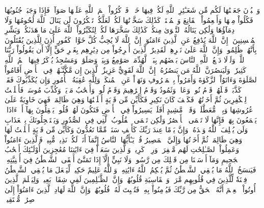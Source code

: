 وَٱلۡبُدۡنَ جَعَلۡنَٰهَا لَكُم مِّن شَعَـٰٓئِرِ ٱللَّهِ لَكُمۡ فِيهَا خَيۡرٞۖ فَٱذۡكُرُواْ ٱسۡمَ ٱللَّهِ عَلَيۡهَا صَوَآفَّۖ فَإِذَا وَجَبَتۡ جُنُوبُهَا فَكُلُواْ مِنۡهَا وَأَطۡعِمُواْ ٱلۡقَانِعَ وَٱلۡمُعۡتَرَّۚ كَذَٰلِكَ سَخَّرۡنَٰهَا لَكُمۡ لَعَلَّكُمۡ تَشۡكُرُونَ
لَن يَنَالَ ٱللَّهَ لُحُومُهَا وَلَا دِمَآؤُهَا وَلَٰكِن يَنَالُهُ ٱلتَّقۡوَىٰ مِنكُمۡۚ كَذَٰلِكَ سَخَّرَهَا لَكُمۡ لِتُكَبِّرُواْ ٱللَّهَ عَلَىٰ مَا هَدَىٰكُمۡۗ وَبَشِّرِ ٱلۡمُحۡسِنِينَ
۞إِنَّ ٱللَّهَ يُدَٰفِعُ عَنِ ٱلَّذِينَ ءَامَنُوٓاْۗ إِنَّ ٱللَّهَ لَا يُحِبُّ كُلَّ خَوَّانٖ كَفُورٍ
أُذِنَ لِلَّذِينَ يُقَٰتَلُونَ بِأَنَّهُمۡ ظُلِمُواْۚ وَإِنَّ ٱللَّهَ عَلَىٰ نَصۡرِهِمۡ لَقَدِيرٌ
ٱلَّذِينَ أُخۡرِجُواْ مِن دِيَٰرِهِم بِغَيۡرِ حَقٍّ إِلَّآ أَن يَقُولُواْ رَبُّنَا ٱللَّهُۗ وَلَوۡلَا دَفۡعُ ٱللَّهِ ٱلنَّاسَ بَعۡضَهُم بِبَعۡضٖ لَّهُدِّمَتۡ صَوَٰمِعُ وَبِيَعٞ وَصَلَوَٰتٞ وَمَسَٰجِدُ يُذۡكَرُ فِيهَا ٱسۡمُ ٱللَّهِ كَثِيرٗاۗ وَلَيَنصُرَنَّ ٱللَّهُ مَن يَنصُرُهُۥٓۚ إِنَّ ٱللَّهَ لَقَوِيٌّ عَزِيزٌ
ٱلَّذِينَ إِن مَّكَّنَّـٰهُمۡ فِي ٱلۡأَرۡضِ أَقَامُواْ ٱلصَّلَوٰةَ وَءَاتَوُاْ ٱلزَّكَوٰةَ وَأَمَرُواْ بِٱلۡمَعۡرُوفِ وَنَهَوۡاْ عَنِ ٱلۡمُنكَرِۗ وَلِلَّهِ عَٰقِبَةُ ٱلۡأُمُورِ
وَإِن يُكَذِّبُوكَ فَقَدۡ كَذَّبَتۡ قَبۡلَهُمۡ قَوۡمُ نُوحٖ وَعَادٞ وَثَمُودُ
وَقَوۡمُ إِبۡرَٰهِيمَ وَقَوۡمُ لُوطٖ
وَأَصۡحَٰبُ مَدۡيَنَۖ وَكُذِّبَ مُوسَىٰۖ فَأَمۡلَيۡتُ لِلۡكَٰفِرِينَ ثُمَّ أَخَذۡتُهُمۡۖ فَكَيۡفَ كَانَ نَكِيرِ
فَكَأَيِّن مِّن قَرۡيَةٍ أَهۡلَكۡنَٰهَا وَهِيَ ظَالِمَةٞ فَهِيَ خَاوِيَةٌ عَلَىٰ عُرُوشِهَا وَبِئۡرٖ مُّعَطَّلَةٖ وَقَصۡرٖ مَّشِيدٍ
أَفَلَمۡ يَسِيرُواْ فِي ٱلۡأَرۡضِ فَتَكُونَ لَهُمۡ قُلُوبٞ يَعۡقِلُونَ بِهَآ أَوۡ ءَاذَانٞ يَسۡمَعُونَ بِهَاۖ فَإِنَّهَا لَا تَعۡمَى ٱلۡأَبۡصَٰرُ وَلَٰكِن تَعۡمَى ٱلۡقُلُوبُ ٱلَّتِي فِي ٱلصُّدُورِ
وَيَسۡتَعۡجِلُونَكَ بِٱلۡعَذَابِ وَلَن يُخۡلِفَ ٱللَّهُ وَعۡدَهُۥۚ وَإِنَّ يَوۡمًا عِندَ رَبِّكَ كَأَلۡفِ سَنَةٖ مِّمَّا تَعُدُّونَ
وَكَأَيِّن مِّن قَرۡيَةٍ أَمۡلَيۡتُ لَهَا وَهِيَ ظَالِمَةٞ ثُمَّ أَخَذۡتُهَا وَإِلَيَّ ٱلۡمَصِيرُ
قُلۡ يَـٰٓأَيُّهَا ٱلنَّاسُ إِنَّمَآ أَنَا۠ لَكُمۡ نَذِيرٞ مُّبِينٞ
فَٱلَّذِينَ ءَامَنُواْ وَعَمِلُواْ ٱلصَّـٰلِحَٰتِ لَهُم مَّغۡفِرَةٞ وَرِزۡقٞ كَرِيمٞ
وَٱلَّذِينَ سَعَوۡاْ فِيٓ ءَايَٰتِنَا مُعَٰجِزِينَ أُوْلَـٰٓئِكَ أَصۡحَٰبُ ٱلۡجَحِيمِ
وَمَآ أَرۡسَلۡنَا مِن قَبۡلِكَ مِن رَّسُولٖ وَلَا نَبِيٍّ إِلَّآ إِذَا تَمَنَّىٰٓ أَلۡقَى ٱلشَّيۡطَٰنُ فِيٓ أُمۡنِيَّتِهِۦ فَيَنسَخُ ٱللَّهُ مَا يُلۡقِي ٱلشَّيۡطَٰنُ ثُمَّ يُحۡكِمُ ٱللَّهُ ءَايَٰتِهِۦۗ وَٱللَّهُ عَلِيمٌ حَكِيمٞ
لِّيَجۡعَلَ مَا يُلۡقِي ٱلشَّيۡطَٰنُ فِتۡنَةٗ لِّلَّذِينَ فِي قُلُوبِهِم مَّرَضٞ وَٱلۡقَاسِيَةِ قُلُوبُهُمۡۗ وَإِنَّ ٱلظَّـٰلِمِينَ لَفِي شِقَاقِۭ بَعِيدٖ
وَلِيَعۡلَمَ ٱلَّذِينَ أُوتُواْ ٱلۡعِلۡمَ أَنَّهُ ٱلۡحَقُّ مِن رَّبِّكَ فَيُؤۡمِنُواْ بِهِۦ فَتُخۡبِتَ لَهُۥ قُلُوبُهُمۡۗ وَإِنَّ ٱللَّهَ لَهَادِ ٱلَّذِينَ ءَامَنُوٓاْ إِلَىٰ صِرَٰطٖ مُّسۡتَقِيمٖ
